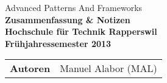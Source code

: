 \begin{titlepage}

	\thispagestyle{empty}
	\BgThispage

	\sffamily\color{titlepagefontcolor}
	\begin{center}
		\Large
		Advanced Patterns And Frameworks\\[5mm]
	   
		\Huge\bfseries
		Zusammenfassung \& Notizen\\[15mm]

		\large\normalfont\sffamily
		Hochschule für Technik Rapperswil\\[1mm]
		Frühjahressemester 2013
	\end{center}
	\vfill

	\begin{multicols}{2}
		\begin{tabularx}{\textwidth}{l X}
			\bfseries Autoren & Manuel Alabor (MAL)\tabularnewline
		\end{tabularx}

	\end{multicols}

\end{titlepage}

\restoregeometry